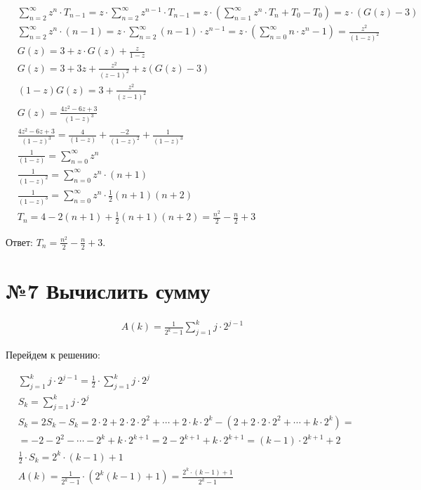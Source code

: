 \documentclass[a4paper,12pt,numbers=noenddot]{scrreprt}
\begin{document}
\begin{align}
& \sum_{n=2}^{\infty} z^n \cdot T_{n-1} = z \cdot \sum_{n=2}^{\infty} z^{n-1} \cdot T_{n-1} = z \cdot (\sum_{n=1}^{\infty} z^{n} \cdot T_n + T_0 - T_0) = z \cdot (G(z) - 3) \\&
\sum_{n=2}^{\infty} z^n \cdot (n - 1) = z \cdot \sum_{n=2}^{\infty} (n - 1) \cdot z^{n-1} = z \cdot (\sum_{n=0}^{\infty} n \cdot z^{n} - 1) = \frac{z^2}{(1-z)^2} \\&
G(z)=3+z\cdot G(z) + \frac{z}{1-z} \\&
G(z)=3+3z+\frac{z^2}{(z-1)^2}+z(G(z)-3) \\&
(1-z)G(z)=3+\frac{z^2}{(z-1)^2} \\&
G(z)=\frac{4z^2-6z+3}{(1-z)^3} \\&
\frac{4z^2-6z+3}{(1-z)^3}=\frac{4}{(1-z)}+\frac{-2}{(1-z)^2}+\frac{1}{(1-z)^3} \\&
\frac{1}{(1-z)}=\sum_{n=0}^{\infty} z^n \\&
\frac{1}{(1-z)^2}=\sum_{n=0}^{\infty} z^n \cdot (n+1) \\&
\frac{1}{(1-z)^3}=\sum_{n=0}^{\infty} z^n \cdot \frac{1}{2}(n+1)(n+2) \\&
T_n=4-2(n+1)+\frac{1}{2}(n+1)(n+2)=\frac{n^2}{2}-\frac{n}{2}+3
\end{align}

\begin{flushleft}
Ответ: $T_n = \frac{n^2}{2}-\frac{n}{2}+3$.
\end{flushleft}

\section{№7 Вычислить сумму}

\begin{align}
    A(k)=\frac{1}{2^k-1} \sum_{j=1}^{k} j \cdot 2^{j-1}
\end{align}

\begin{flushleft}
Перейдем к решению:
\end{flushleft}

\begin{align}
& \sum_{j=1}^{k} j \cdot 2^{j-1} = \frac{1}{2} \cdot \sum_{j=1}^{k} j \cdot 2^j \\&
S_k = \sum_{j=1}^{k} j \cdot 2^j \\&
S_k=2S_k-S_k=2 \cdot 2 + 2 \cdot 2 \cdot 2^2 + \cdots + 2 \cdot k \cdot 2^k - (2+2 \cdot 2 \cdot 2^2 + \cdots + k \cdot 2^k) = \\&
= -2 -2^2 - \cdots - 2^k + k \cdot 2^{k+1} = 2 - 2^{k+1} + k \cdot 2^{k+1} = (k-1) \cdot 2^{k+1} + 2 \\&
\frac{1}{2} \cdot S_k = 2^k \cdot (k-1) + 1 \\&
A(k) = \frac{1}{2^k-1} \cdot (2^k(k-1) + 1) = \frac{2^k \cdot (k-1) + 1}{2^k-1}
\end{align}
\end{document}
